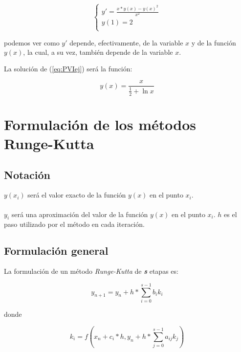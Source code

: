 \begin{equation} \label{eq:PVIej}
\left\{ \begin{array}{l}
y' = \frac{x * y(x) - y(x)^2}{x^2} \\
y(1) = 2 \\
\end{array} \right.
\end{equation}

podemos ver como $y'$ depende, efectivamente, de la variable $x$ y de la
funci\'on $y(x)$, la cual, a su vez, tambi\'en depende de la variable $x$.
\newline

La soluci\'on de (\ref{eq:PVIej}) ser\'a la funci\'on:

\begin{equation}
y(x) = \frac{x}{\frac{1}{2}+\ln x}
\end{equation}

\section{Formulaci\'on de los m\'etodos Runge-Kutta}

\subsection{Notaci\'on}

$y(x_i)$ ser\'a el valor exacto de la funci\'on $y(x)$ en el punto $x_i$.\\ \\
$y_i$ ser\'a una aproximaci\'on del valor de la funci\'on $y(x)$ en el punto
$x_i$.\newline \newline
$h$ es el paso utilizado por el m\'etodo en cada iteraci\'on.

\newpage

\subsection{Formulaci\'on general}

La formulaci\'on de un m\'etodo \emph{Runge-Kutta} de \emph{\textbf{s}} 
etapas es:

\begin{equation}
y_{n+1} = y_{n} + h * \sum_{i=0}^{s-1} b_i k_i
\end{equation}

donde

\begin{equation}
k_i = f(x_n + c_i * h, y_n + h * \sum_{j=0}^{s-1} a_{ij} k_j)
\end{equation}

